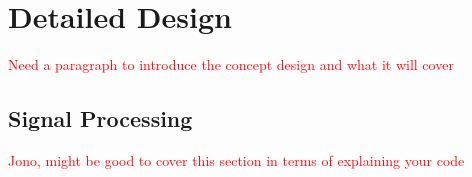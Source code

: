 \documentclass[main.tex]{subfiles}
\begin{document}
\chapter{Detailed Design}
\textcolor{red}{Need a paragraph to introduce the concept design and what it will cover}

\section{Signal Processing}
\textcolor{red}{Jono, might be good to cover this section in terms of explaining your code}
\end{document}
